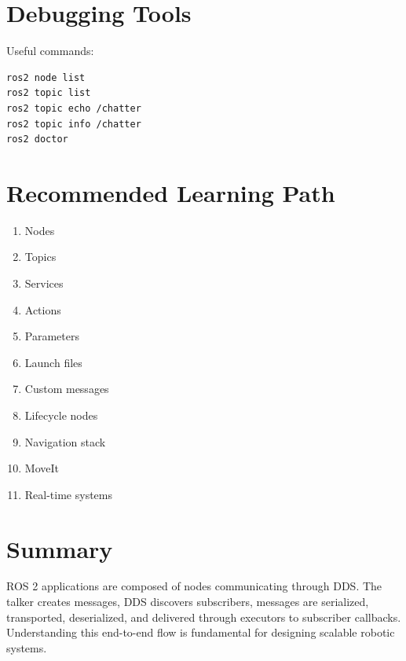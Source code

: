 \documentclass[11pt]{article}
\begin{document}
\section{Debugging Tools}

Useful commands:

\begin{verbatim}
ros2 node list
ros2 topic list
ros2 topic echo /chatter
ros2 topic info /chatter
ros2 doctor
\end{verbatim}

\section{Recommended Learning Path}

\begin{enumerate}
\item Nodes
\item Topics
\item Services
\item Actions
\item Parameters
\item Launch files
\item Custom messages
\item Lifecycle nodes
\item Navigation stack
\item MoveIt
\item Real-time systems
\end{enumerate}

\section{Summary}

ROS 2 applications are composed of nodes communicating through DDS.
The talker creates messages, DDS discovers subscribers, messages are serialized,
transported, deserialized, and delivered through executors to subscriber callbacks.
Understanding this end-to-end flow is fundamental for designing scalable robotic systems.
\end{document}
